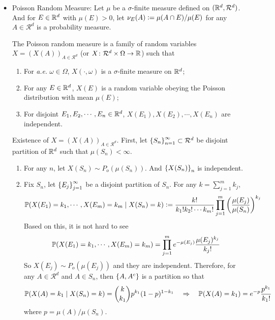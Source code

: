 \documentclass[a4paper,12pt]{article}
\begin{document}
\begin{itemize}
  \item Poisson Random Measure: Let $\mu$ be a $\sigma$-finite measure defined on $(\mathbb{R}^d,\mathcal{R}^d)$. And for $E \in \mathbb{R}^d$ with $\mu(E) > 0$, let $\nu_E(A) \vcentcolon= \mu(A \cap E) / \mu(E)$ for any $A \in \mathcal{R}^d$ is a probability measure.

  \noindent The Poisson random measure is a family of random variables $X=(X(A))_{A \in \mathcal{R}^d}$ (or $X \colon \mathcal{R}^d \times \Omega \rightarrow \mathbb{R}$) such that
  \begin{enumerate}[label=(\arabic*)]
    \item For \emph{a.e.} $\omega \in \Omega$, $X(\cdot, \omega)$ is a $\sigma$-finite measure on $\mathbb{R}^d$;
    \item For any $E \in \mathbb{R}^d$, $X(E)$ is a random variable obeying the Poisson distribution with mean $\mu(E)$;
    \item For disjoint $E_1,E_2,\cdots,E_n \in \mathbb{R}^d$, $X(E_1),X(E_2),\cdots,X(E_n)$ are independent.
  \end{enumerate}
  
  \noindent Existence of $X=(X(A))_{A \in \mathcal{R}^d}$. First, let $\left\{S_n\right\}_{n=1}^{\infty} \subset \mathcal{R}^d$ be disjoint partition of $\mathbb{R}^d$ such that $\mu(S_n) < \infty$.
  \begin{enumerate}[label=\Roman*.]
    \item For any $n$, let $X(S_n) \sim P_o(\mu(S_n))$. And $\left\{X(S_n)\right\}_n$ is independent.
    \item Fix $S_n$, let $\left\{E_j\right\}_{j=1}^{\infty}$ be a disjoint partition of $S_n$. For any $k = \sum_{j=1}^mk_j$,
    \begin{equation*}
      \mathbb{P}(X(E_1)=k_1,\cdots,X(E_m)=k_m \mid X(S_n)=k) \vcentcolon= \frac{k!}{k_1!k_2!\cdots k_m!}\prod_{j=1}^m\left(\frac{\mu(E_j)}{\mu(S_n)}\right)^{k_j}
    \end{equation*}
    Based on this, it is not hard to see
    \begin{equation*}
      \mathbb{P}(X(E_1)=k_1,\cdots,X(E_m)=k_m) = \prod_{j=1}^me^{-\mu(E_j)}\frac{\mu(E_j)^{k_j}}{k_j!}
    \end{equation*}
    So $X(E_j) \sim P_o(\mu(E_j))$ and they are independent. Therefore, for any $A \in \mathcal{R}^d$ and $A \in S_n$, then $\left\{A,A^c\right\}$ is a partition so that 
    \begin{equation*}
      \mathbb{P}(X(A) = k_1 \mid X(S_n) = k) = \binom{k}{k_1}p^{k_1}(1-p)^{1-k_1}\quad \Rightarrow \quad \mathbb{P}(X(A) = k_1) = e^{-p}\frac{p^{k_1}}{k_1!}
    \end{equation*}
    where $p = \mu(A) / \mu(S_n)$. 


\end{enumerate}
\end{itemize}
\end{document}

